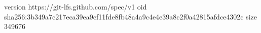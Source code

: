 version https://git-lfs.github.com/spec/v1
oid sha256:3b349a7c217eca39ea9cf11fde8fb48a4a9c4e4e39a8c2f0a42815afdce4302c
size 349676
